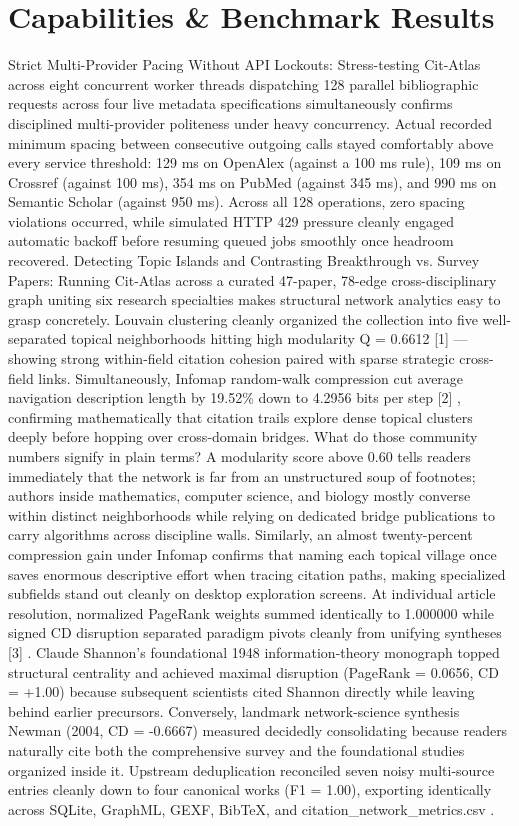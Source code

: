 \documentclass[10pt,letterpaper]{article}
\begin{document}
\section{Capabilities \& Benchmark Results}
Strict Multi-Provider Pacing Without API Lockouts: Stress-testing Cit-Atlas across eight concurrent worker threads dispatching 128 parallel bibliographic requests across four live metadata specifications simultaneously confirms disciplined multi-provider politeness under heavy concurrency. Actual recorded minimum spacing between consecutive outgoing calls stayed comfortably above every service threshold: 129 ms on OpenAlex (against a 100 ms rule), 109 ms on Crossref (against 100 ms), 354 ms on PubMed (against 345 ms), and 990 ms on Semantic Scholar (against 950 ms). Across all 128 operations, zero spacing violations occurred, while simulated HTTP 429 pressure cleanly engaged automatic backoff before resuming queued jobs smoothly once headroom recovered. Detecting Topic Islands and Contrasting Breakthrough vs. Survey Papers: Running Cit-Atlas across a curated 47-paper, 78-edge cross-disciplinary graph uniting six research specialties makes structural network analytics easy to grasp concretely. Louvain clustering cleanly organized the collection into five well-separated topical neighborhoods hitting high modularity Q = 0.6612 [1] ---showing strong within-field citation cohesion paired with sparse strategic cross-field links. Simultaneously, Infomap random-walk compression cut average navigation description length by 19.52\% down to 4.2956 bits per step [2] , confirming mathematically that citation trails explore dense topical clusters deeply before hopping over cross-domain bridges. What do those community numbers signify in plain terms? A modularity score above 0.60 tells readers immediately that the network is far from an unstructured soup of footnotes; authors inside mathematics, computer science, and biology mostly converse within distinct neighborhoods while relying on dedicated bridge publications to carry algorithms across discipline walls. Similarly, an almost twenty-percent compression gain under Infomap confirms that naming each topical village once saves enormous descriptive effort when tracing citation paths, making specialized subfields stand out cleanly on desktop exploration screens. At individual article resolution, normalized PageRank weights summed identically to 1.000000 while signed CD disruption separated paradigm pivots cleanly from unifying syntheses [3] . Claude Shannon's foundational 1948 information-theory monograph topped structural centrality and achieved maximal disruption (PageRank = 0.0656, CD = +1.00) because subsequent scientists cited Shannon directly while leaving behind earlier precursors. Conversely, landmark network-science synthesis Newman (2004, CD = -0.6667) measured decidedly consolidating because readers naturally cite both the comprehensive survey and the foundational studies organized inside it. Upstream deduplication reconciled seven noisy multi-source entries cleanly down to four canonical works (F1 = 1.00), exporting identically across SQLite, GraphML, GEXF, BibTeX, and citation\_network\_metrics.csv .
\end{document}
